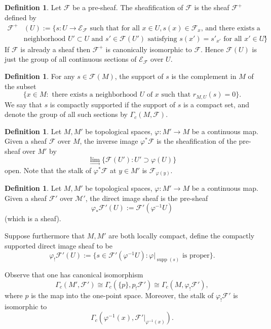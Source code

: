 \documentclass[a4paper]{amsart}
\newcommand{\supp}{\operatorname{supp}}
\newcommand{\maE}{\mathcal E}
\newcommand{\maF}{\mathcal F}
\newcommand{\maM}{\mathcal M}
\newcommand\<{\langle}
\renewcommand\>{\rangle}
\theoremstyle{definition}
\newtheorem{dfn}[theorem]{Definition}
\theoremstyle{remark}
\begin{document}
\begin{dfn}
Let $\maF$ be a pre-sheaf. The sheafification of $\maF$ is the sheaf $\maF ^+$
defined by
\begin{align*}
\maF ^+ & (U) := \Big\{ s : U \to \maE _\maF \text{ such that for all $x \in U, s(x) \in \maF _x$, and there exists a} \\
& \text{neighborhood $U' \subset U$ and $s' \in \maF (U')$ satisfying $s(x') = s' _{x'}$ for all $x' \in U'$}. \Big\}
\end{align*}
If $\maF$ is already a sheaf then $\maF ^+$ is canonically isomorphic to $\maF$.
Hence $\maF (U)$ is just the group of all continuous sections of $\maE _\maF$ over $U$.
\end{dfn}

\begin{dfn}
For any $s \in \maF (M)$, the support of $s$ is the complement in $M$ of the subset
$$ \{ x \in M :
\text{ there exists a neighborhood $U$ of $x$ such that } r _{M,U} (s) = 0 \}.$$
We say that $s$ is compactly supported if the support of $s$ is a compact set,
and denote the group of all such sections by $\Gamma _c (M, \maF)$.
\end{dfn}

\begin{dfn}
\cite[Definition 2.3.1 (ii)]{Moerdijk;EtaleHomology}
Let $M, M'$ be topological spaces, $\varphi : M' \to M$ be a continuous map.
Given a sheaf $\maF$ over $M$, the inverse image $\varphi^* \maF$ is the sheafification of the pre-sheaf over $M'$ by
$$ \lim _\rightarrow \{ \maF (U' ) : U' \supset \varphi (U)\}$$ open.
Note that the stalk of $\varphi ^* \maF$ at $y \in M'$ is $\maF _{\varphi (y)}$.
\end{dfn}

\begin{dfn}
\cite[Definition 2.3.1 (i), Equation (2.5.1)]{Moerdijk;EtaleHomology} Let $M, M'$ be topological spaces,
$\varphi : M' \to M$ be a continuous map. Given a sheaf $\maF'$ over $\maM'$, the direct
image sheaf is the pre-sheaf
$$\varphi _* \maF' (U ) := \maF' (\varphi^{-1} U)$$
(which is a sheaf).

Suppose furthermore that $M ,M'$ are both locally compact, define the compactly supported direct image sheaf to be
$$ \varphi _! \maF' (U) := \{ s \in \maF' (\varphi^{-1} U ) : \varphi \vert_{\supp(s)} \text{ is proper} \}.$$
\end{dfn}
Observe that one has canonical isomorphism
$$ \Gamma _c (M' , \maF') \cong \Gamma _c (\{p \}, p_! \maF') \cong \Gamma _c (M, \varphi _! \maF'),$$
where $p$ is the map into the one-point space. Moreover, the stalk of $\varphi_! \maF'$ is
isomorphic to
$$\Gamma _c (\varphi^{-1} (x), \maF' \vert _{\varphi^{-1}(x)}).$$
\end{document}
